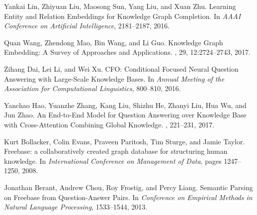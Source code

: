 \documentclass[11pt]{article}
\begin{document}
\begin{thebibliography}{10}
\itemsep=1pt
\begin{small}


 Yankai Lin, Zhiyuan Liu, Maosong Sun, Yang Liu, and Xuan Zhu. \newblock  Learning Entity and Relation Embeddings for Knowledge Graph Completion. \newblock In {\em AAAI Conference on Artificial Intelligence}, 2181--2187, 2016.

 Quan Wang, Zhendong Mao, Bin Wang, and Li Guo. \newblock  Knowledge Graph Embedding: A Survey of Approaches and Applications. , 29, 12:2724--2743, 2017.

 Zihang Dai, Lei Li, and Wei Xu.  \newblock  CFO: Conditional Focused Neural Question Answering with Large-Scale Knowledge Bases. \newblock In {\em Annual Meeting of the Association for Computational Linguistics}, 800--810, 2016.

 Yanchao Hao, Yuanzhe Zhang, Kang Liu, Shizhu He, Zhanyi Liu, Hua Wu, and Jun Zhao. \newblock  An End-to-End Model for Question Answering over Knowledge Base with Cross-Attention Combining Global Knowledge. , 221--231, 2017.

Kurt Bollacker, Colin Evans, Praveen Paritosh, Tim Sturge, and Jamie Taylor.
\newblock Freebase: a collaboratively created graph database for structuring
  human knowledge.
\newblock In {\em International Conference on Management of Data}, pages
  1247--1250, 2008.




 Jonathan Berant, Andrew Chou, Roy Frostig, and Percy Liang.  \newblock  Semantic Parsing on Freebase from Question-Answer Pairs. \newblock In {\em Conference on Empirical Methods in Natural Language Processing}, 1533--1544, 2013.


\end{small}
\end{thebibliography}
\end{document}
